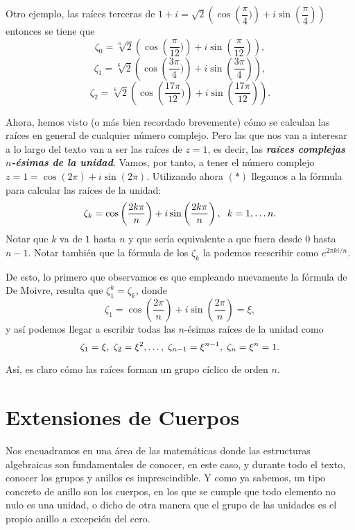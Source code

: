 \documentclass[12pt]{article}
\begin{document}
Otro ejemplo, las raíces terceras de $1 + i = \sqrt{2}\left(\cos \left( \dfrac{\pi}{4})\right) + i\sin \left( \dfrac{\pi}{4} \right)\right)$ entonces se tiene que $$ \zeta_{0} = \sqrt[6]{2}\left(\cos \left( \dfrac{\pi}{12})\right) + i\sin \left( \dfrac{\pi}{12} \right)\right),$$ $$\zeta_{1} = \sqrt[6]{2}\left(\cos \left( \dfrac{3 \pi}{4})\right) + i\sin \left( \dfrac{3 \pi}{4} \right)\right),$$ $$\zeta_{2} = \sqrt[6]{2}\left(\cos \left( \dfrac{17 \pi}{12})\right) + i\sin \left( \dfrac{17 \pi}{12} \right)\right).$$

Ahora, hemos visto (o más bien recordado brevemente) cómo se calculan las raíces en general de cualquier número complejo. Pero las que nos van a interesar a lo largo del texto van a ser las raíces de $z = 1$, es decir, las \textbf{\textit{raíces complejas $n$-ésimas de la unidad}}. Vamos, por tanto, a tener el número complejo $z = 1 = \cos(2\pi) + i \sin (2\pi)$. Utilizando ahora $(\ast)$ llegamos a la fórmula para calcular las raíces de la unidad: $$\zeta_{k} = \cos \left( \dfrac{2k\pi}{n} \right) + i\sin \left( \dfrac{2k\pi}{n} \right), \hspace{0.2cm} k = 1, \ldots n.$$
Notar que $k$ va de $1$ hasta $n$ y que sería equivalente a que fuera desde $0$ hasta $n-1$. Notar también que la fórmula de los $\zeta_{k}$ la podemos reescribir como $e^{2\pi k i/n}$.

De esto, lo primero que observamos es que empleando nuevamente la fórmula de De Moivre, resulta que $\zeta_{1}^{k} = \zeta_{k}$, donde $$\zeta_{1} =  \cos \left( \dfrac{2\pi}{n} \right) + i\sin \left( \dfrac{2\pi}{n} \right) = \xi,$$ y así podemos llegar a escribir todas las $n$-ésimas raíces de la unidad como $$\zeta_{1} = \xi, \hspace{0.1cm} \zeta_{2} = \xi^{2}, \ldots, \hspace{0.1cm} \zeta_{n-1} = \xi^{n-1}, \hspace{0.1cm}\zeta_{n} = \xi^{n} = 1.$$

Así, es claro cómo las raíces forman un grupo cíclico de orden $n$.
\section{Extensiones de Cuerpos}
Nos encuadramos en una área de las matemáticas donde las estructuras algebraicas son fundamentales de conocer, en este caso, y durante todo el texto, conocer los grupos y anillos es imprescindible. Y como ya sabemos, un tipo concreto de anillo son los cuerpos, en los que se cumple que todo elemento no nulo es una unidad, o dicho de otra manera que el grupo de las unidades es el propio anillo a excepción del cero. 
\end{document}
